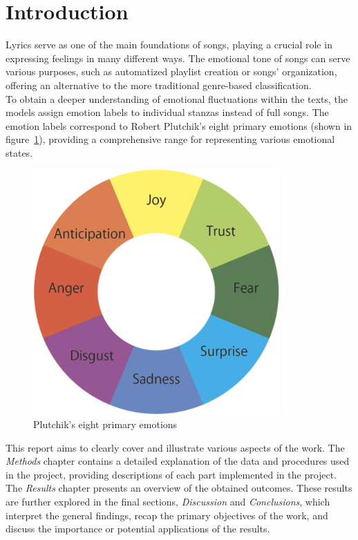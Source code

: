 \chapter*{Introduction}
\label{ch:Introduction}
Lyrics serve as one of the main foundations of songs, playing a crucial role in
expressing feelings in many different ways.
The emotional tone of songs can serve various purposes, such as
automatized playlist creation or songs' organization,
offering an alternative to the more traditional genre-based classification. \\
To obtain a deeper understanding of emotional fluctuations within the texts,
the models assign emotion labels to individual stanzas instead of full songs.
The emotion labels correspond to Robert Plutchik's eight primary emotions
(shown in figure~\ref{fig:primary_emotions}), providing a comprehensive range
for representing various emotional states.\\
\begin{figure}[H]
    \centering
    \includegraphics[scale= 0.30]{pictures/plutchik_primary_emotions.png}
    \caption{Plutchik's eight primary emotions}
    \label{fig:primary_emotions}
\end{figure}

This report aims to clearly cover and illustrate various aspects of the work. 
The \textit{Methods} chapter contains a detailed explanation of the data and
procedures used in the project, providing descriptions of each part implemented
in the project.
The \textit{Results} chapter presents an overview of the
obtained outcomes.
These results are further explored in the final sections, \textit{Discussion}
and \textit{Conclusions}, which interpret the general findings, recap the
primary objectives of the work, and discuss the importance or potential
applications of the results.